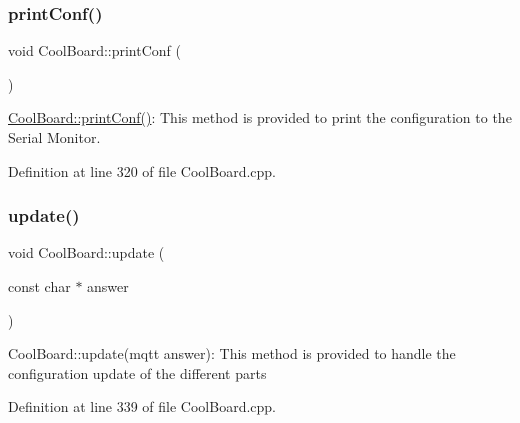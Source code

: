 \subsubsection{\texorpdfstring{print\+Conf()}{printConf()}}
{\footnotesize\ttfamily void Cool\+Board\+::print\+Conf (\begin{DoxyParamCaption}{ }\end{DoxyParamCaption})}

\hyperlink{class_cool_board_a486507b8f0981d3cc671ed31c2145755}{Cool\+Board\+::print\+Conf()}\+: This method is provided to print the configuration to the Serial Monitor. 

Definition at line 320 of file Cool\+Board.\+cpp.

\mbox{\label{class_cool_board_a8612756d3f73198cdde857a66f0fe690}} 
\subsubsection{\texorpdfstring{update()}{update()}}
{\footnotesize\ttfamily void Cool\+Board\+::update (\begin{DoxyParamCaption}\item[{const char $\ast$}]{answer }\end{DoxyParamCaption})}

Cool\+Board\+::update(mqtt answer)\+: This method is provided to handle the configuration update of the different parts 

Definition at line 339 of file Cool\+Board.\+cpp.

